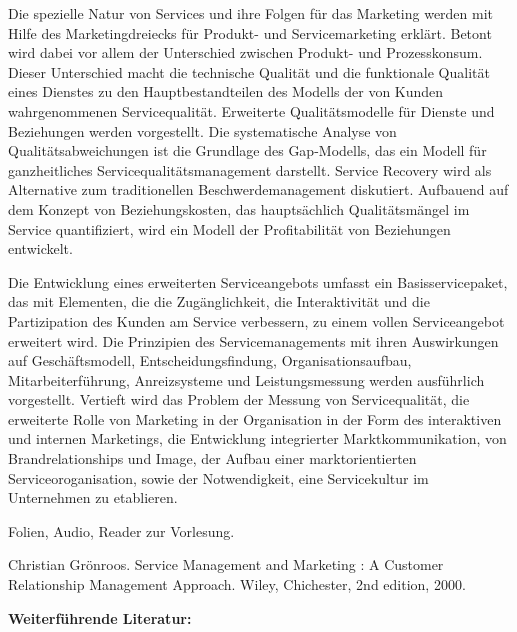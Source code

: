 \begin{course}
\begin{content}
 

Die spezielle Natur von Services und ihre Folgen für das Marketing werden mit Hilfe des Marketingdreiecks für Produkt- und Servicemarketing erklärt. Betont wird dabei vor allem der Unterschied zwischen Produkt- und Prozesskonsum. Dieser Unterschied macht die technische Qualität und die funktionale Qualität eines Dienstes zu den Hauptbestandteilen des Modells der von Kunden wahrgenommenen Servicequalität. Erweiterte Qualitätsmodelle für Dienste und Beziehungen werden vorgestellt. Die systematische Analyse von Qualitätsabweichungen ist die Grundlage des Gap-Modells, das ein Modell für ganzheitliches Servicequalitätsmanagement darstellt. Service Recovery wird als Alternative zum traditionellen Beschwerdemanagement diskutiert. Aufbauend auf dem Konzept von Beziehungskosten, das hauptsächlich Qualitätsmängel im Service quantifiziert, wird ein Modell der Profitabilität von Beziehungen entwickelt.

 

Die Entwicklung eines erweiterten Serviceangebots umfasst ein Basisservicepaket, das mit Elementen, die die Zugänglichkeit, die Interaktivität und die Partizipation des Kunden am Service verbessern, zu einem vollen Serviceangebot erweitert wird. Die Prinzipien des Servicemanagements mit ihren Auswirkungen auf Geschäftsmodell, Entscheidungsfindung, Organisationsaufbau, Mitarbeiterführung, Anreizsysteme und Leistungsmessung werden ausführlich vorgestellt. Vertieft wird das Problem der Messung von Servicequalität, die erweiterte Rolle von Marketing in der Organisation in der Form des interaktiven und internen Marketings, die Entwicklung integrierter Marktkommunikation, von Brandrelationships und Image, der Aufbau einer marktorientierten Serviceoroganisation, sowie der Notwendigkeit, eine Servicekultur im Unternehmen zu etablieren.


\end{content}

\begin{media}Folien, Audio, Reader zur Vorlesung.

\end{media}

\begin{literature} 

Christian Grönroos. Service Management and Marketing : A Customer Relationship Management Approach. Wiley, Chichester, 2nd edition, 2000.

 

\textbf{Weiterführende Literatur:}


\end{literature}
\end{course}
